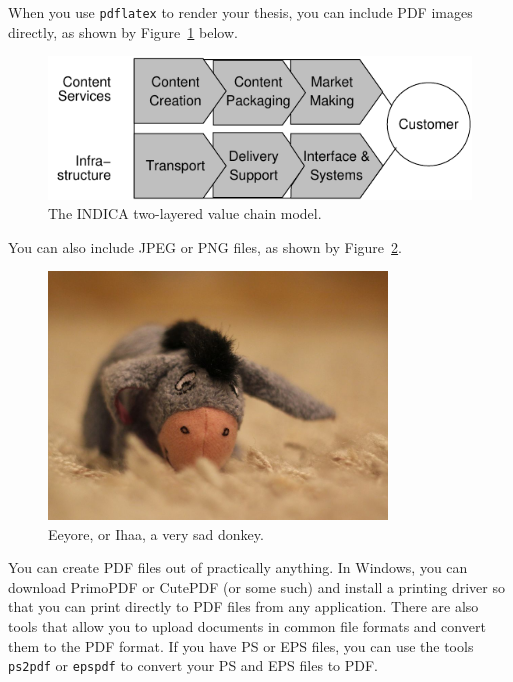 When you use \texttt{pdflatex} to render your thesis, you can include PDF images
directly, as shown by Figure~\ref{fig:indica_model} below.

\begin{figure}[ht]
  \begin{center}
    \includegraphics[width=\textwidth]{images/indica_model.pdf}
    \caption{The INDICA two-layered value chain model.}
    \label{fig:indica_model}
  \end{center}
\end{figure}

You can also include JPEG or PNG files, as shown by Figure~\ref{fig:eeyore}.

\begin{figure}[ht]
  \begin{center}
    \includegraphics[width=9cm]{images/ihaa.jpg}
    \caption{Eeyore, or Ihaa, a very sad donkey.}
    \label{fig:eeyore}
  \end{center}
\end{figure}

You can create PDF files out of practically anything.
In Windows, you can download PrimoPDF or CutePDF (or some such) and install a
printing driver so that you can print directly to PDF files from any
application. There are also tools that allow you to upload documents in common
file formats and convert them to the PDF format.
If you have PS or EPS files, you can use the tools \texttt{ps2pdf} or
\texttt{epspdf} to convert your PS and EPS files to PDF\@.

